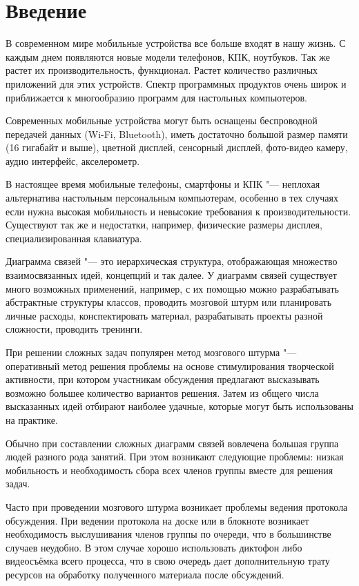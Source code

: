 \newpage

\chapter*{Введение}\label{chap:introduction}

В современном мире мобильные устройства все больше входят в нашу жизнь. С каждым
днем появляются новые модели телефонов, КПК, ноутбуков. Так же растет их
производительность, функционал. Растет количество различных приложений для этих
устройств. Спектр программных продуктов очень широк и приближается к
многообразию программ для настольных компьютеров.

Современных мобильные устройства могут быть оснащены беспроводной передачей
данных (Wi-Fi, Bluetooth), иметь достаточно большой размер памяти (16 гигабайт и
выше), цветной дисплей, сенсорный дисплей, фото-видео камеру, аудио интерфейс,
акселерометр.

В настоящее время мобильные телефоны, смартфоны и КПК "--- неплохая альтернатива
настольным персональным компьютерам, особенно в тех случаях если нужна высокая
мобильность и невысокие требования к производительности. Существуют так же и
недостатки, например, физические размеры дисплея, специализированная клавиатура.

Диаграмма связей "--- это иерархическая структура, отображающая множество
взаимосвязанных идей, концепций и так далее. У диаграмм связей существует много
возможных применений, например, с их помощью можно разрабатывать абстрактные
структуры классов, проводить мозговой штурм или планировать личные расходы,
конспектировать материал, разрабатывать проекты разной сложности, проводить
тренинги.

При решении сложных задач популярен метод мозгового штурма "--- оперативный
метод решения проблемы на основе стимулирования творческой активности, при
котором участникам обсуждения предлагают высказывать возможно большее количество
вариантов решения. Затем из общего числа высказанных идей отбирают наиболее
удачные, которые могут быть использованы на практике.

Обычно при составлении сложных диаграмм связей вовлечена большая группа людей
разного рода занятий. При этом возникают следующие проблемы: низкая мобильность
и необходимость сбора всех членов группы вместе для решения задач.

Часто при проведении мозгового штурма возникает проблемы ведения протокола
обсуждения. При ведении протокола на доске или в блокноте возникает
необходимость выслушивания членов группы по очереди, что в большинстве случаев
неудобно. В этом случае хорошо использовать диктофон либо видеосъёмка всего
процесса, что в свою очередь дает дополнительную трату ресурсов на обработку
полученного материала после обсуждений.

